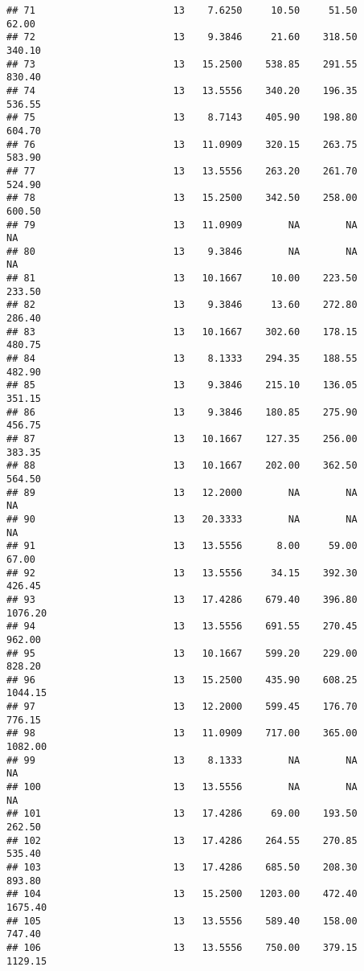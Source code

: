 \documentclass[]{article}
\begin{document}
\begin{verbatim}
## 71                        13    7.6250     10.50     51.50      62.00
## 72                        13    9.3846     21.60    318.50     340.10
## 73                        13   15.2500    538.85    291.55     830.40
## 74                        13   13.5556    340.20    196.35     536.55
## 75                        13    8.7143    405.90    198.80     604.70
## 76                        13   11.0909    320.15    263.75     583.90
## 77                        13   13.5556    263.20    261.70     524.90
## 78                        13   15.2500    342.50    258.00     600.50
## 79                        13   11.0909        NA        NA         NA
## 80                        13    9.3846        NA        NA         NA
## 81                        13   10.1667     10.00    223.50     233.50
## 82                        13    9.3846     13.60    272.80     286.40
## 83                        13   10.1667    302.60    178.15     480.75
## 84                        13    8.1333    294.35    188.55     482.90
## 85                        13    9.3846    215.10    136.05     351.15
## 86                        13    9.3846    180.85    275.90     456.75
## 87                        13   10.1667    127.35    256.00     383.35
## 88                        13   10.1667    202.00    362.50     564.50
## 89                        13   12.2000        NA        NA         NA
## 90                        13   20.3333        NA        NA         NA
## 91                        13   13.5556      8.00     59.00      67.00
## 92                        13   13.5556     34.15    392.30     426.45
## 93                        13   17.4286    679.40    396.80    1076.20
## 94                        13   13.5556    691.55    270.45     962.00
## 95                        13   10.1667    599.20    229.00     828.20
## 96                        13   15.2500    435.90    608.25    1044.15
## 97                        13   12.2000    599.45    176.70     776.15
## 98                        13   11.0909    717.00    365.00    1082.00
## 99                        13    8.1333        NA        NA         NA
## 100                       13   13.5556        NA        NA         NA
## 101                       13   17.4286     69.00    193.50     262.50
## 102                       13   17.4286    264.55    270.85     535.40
## 103                       13   17.4286    685.50    208.30     893.80
## 104                       13   15.2500   1203.00    472.40    1675.40
## 105                       13   13.5556    589.40    158.00     747.40
## 106                       13   13.5556    750.00    379.15    1129.15

\end{verbatim}
\end{document}
